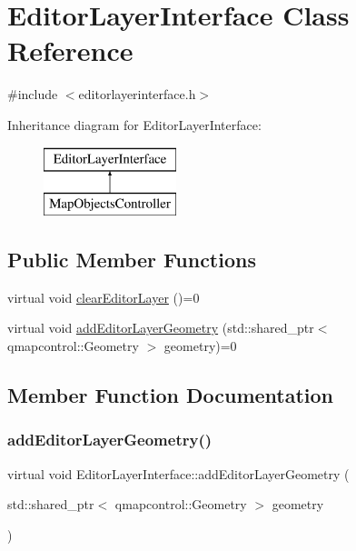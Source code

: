 \hypertarget{class_editor_layer_interface}{}\section{Editor\+Layer\+Interface Class Reference}
\label{class_editor_layer_interface}


{\ttfamily \#include $<$editorlayerinterface.\+h$>$}

Inheritance diagram for Editor\+Layer\+Interface\+:\begin{figure}[H]
\begin{center}
\leavevmode
\includegraphics[height=2.000000cm]{d0/d0a/class_editor_layer_interface}
\end{center}
\end{figure}
\subsection*{Public Member Functions}
\begin{DoxyCompactItemize}
\item 
virtual void \mbox{\hyperlink{class_editor_layer_interface_a7e886341490323a003ccdd497f339dcc}{clear\+Editor\+Layer}} ()=0
\item 
virtual void \mbox{\hyperlink{class_editor_layer_interface_a44cbc096e8342a774201a2a08cfb180a}{add\+Editor\+Layer\+Geometry}} (std\+::shared\+\_\+ptr$<$ qmapcontrol\+::\+Geometry $>$ geometry)=0
\end{DoxyCompactItemize}


\subsection{Member Function Documentation}
\mbox{\label{class_editor_layer_interface_a44cbc096e8342a774201a2a08cfb180a}} 
\subsubsection{\texorpdfstring{addEditorLayerGeometry()}{addEditorLayerGeometry()}}
{\footnotesize\ttfamily virtual void Editor\+Layer\+Interface\+::add\+Editor\+Layer\+Geometry (\begin{DoxyParamCaption}\item[{std\+::shared\+\_\+ptr$<$ qmapcontrol\+::\+Geometry $>$}]{geometry }\end{DoxyParamCaption})\hspace{0.3cm}{\ttfamily [pure virtual]}}



